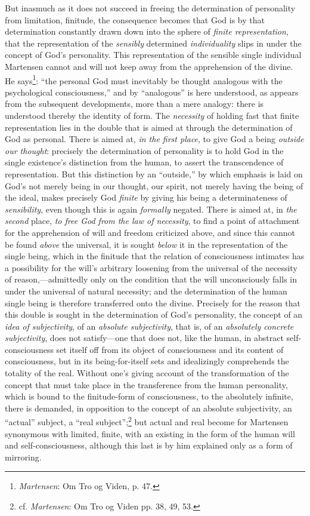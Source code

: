\documentclass[12pt,a4paper]{book}
\begin{document}
But inasmuch as it does not succeed in freeing the determination of personality from
limitation, finitude, the consequence becomes that God is by that determination
constantly drawn down into the sphere of \emph{finite representation}, that the representation
of the \emph{sensibly} determined \emph{individuality} slips in under the concept of God's
personality. This representation of the sensible single individual Martensen cannot
and will not keep away from the apprehension of the divine. He says\footnote{\emph{Martensen}:
Om Tro og Viden, p. 47.}: ``the personal God must inevitably be thought analogous with
the psychological consciousness,'' and by ``analogous'' is here understood, as appears
from the subsequent developments, more than a mere analogy: there is understood thereby
the identity of form. The \emph{necessity} of holding fast that finite representation lies in
the double that is aimed at through the determination of God as personal. There is aimed
at, \emph{in the first place}, to give God a being \emph{outside our thought}: precisely the
determination of personality is to hold God in the single existence's distinction from
the human, to assert the transcendence of representation. But this distinction by an
``outside,'' by which emphasis is laid on God's not merely being in our thought, our
spirit, not merely having the being of the ideal, makes precisely God \emph{finite} by
giving his being a determinateness of \emph{sensibility}, even though this is again
\emph{formally} negated. There is aimed at, in \emph{the second} place, \emph{to free God from the
law of necessity}, to find a point of attachment for the apprehension of will and freedom
criticized above, and since this cannot be found \emph{above} the universal, it is sought
\emph{below} it in the representation of the single being, which in the finitude that
the relation of consciousness intimates has a possibility for the will's arbitrary
loosening from the universal of the necessity of reason,---admittedly only on the
condition that the will unconsciously falls in under the universal of natural necessity;
and the determination of the human single being is therefore transferred onto the divine.
Precisely for the reason that this double is sought in the determination of God's
personality, the concept of an \emph{idea of subjectivity}, of an \emph{absolute subjectivity}, that
is, of an \emph{absolutely concrete subjectivity}, does not satisfy---one that does not, like the
human, in abstract self-consciousness set itself off from its object of consciousness and
its content of consciousness, but in its being-for-itself sets and idealizingly
comprehends the totality of the real. Without one's giving account of the transformation of
the concept that must take place in the transference from the human personality, which is
bound to the finitude-form of consciousness, to the absolutely infinite, there is demanded,
in opposition to the concept of an absolute subjectivity, an ``actual'' subject, a ``real
subject'';\footnote{cf. \emph{Martensen}: Om Tro og Viden pp. 38, 49, 53.} but actual and real
become for Martensen synonymous with limited, finite, with an existing in the form of the
human will and self-consciousness, although this last is by him explained only as a form
of mirroring.
\end{document}
